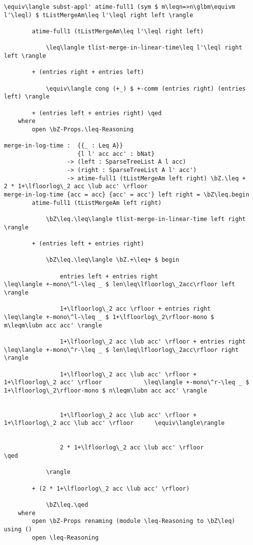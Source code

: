 \begin{lstlisting}[caption={Merging heaps},label={lst:appendix:heap:merge}]
            \equiv\langle subst-appl' atime-full1 (sym $ m\leqn=>n\glbm\equivm l'\leql) $ tListMergeAm\leq l'\leql right left \rangle

        atime-full1 (tListMergeAm\leq l'\leql right left)

            \leq\langle tlist-merge-in-linear-time\leq l'\leql right left \rangle

        + (entries right + entries left)

            \equiv\langle cong (+_) $ +-comm (entries right) (entries left) \rangle

        + (entries left + entries right) \qed
    where
        open \bZ-Props.\leq-Reasoning

merge-in-log-time :  {{_ : Leq A}}
                     {l l' acc acc' : bNat}
                  -> (left : SparseTreeList A l acc)
                  -> (right : SparseTreeList A l' acc')
                  -> atime-full1 (tListMergeAm left right) \bZ.\leq + 2 * 1+\lfloorlog\_2 acc \lub acc' \rfloor
merge-in-log-time {acc = acc} {acc' = acc'} left right = \bZ\leq.begin
        atime-full1 (tListMergeAm left right)

            \bZ\leq.\leq\langle tlist-merge-in-linear-time left right \rangle

        + (entries left + entries right)

            \bZ\leq.\leq\langle \bZ.+\leq+ $ begin

                entries left + entries right                     \leq\langle +-mono\^l-\leq _ $ len\leq\lfloorlog\_2acc\rfloor left \rangle

                1+\lfloorlog\_2 acc \rfloor + entries right                    \leq\langle +-mono\^l-\leq _ $ 1+\lfloorlog\_2\rfloor-mono $ m\leqm\lubn acc acc' \rangle

                1+\lfloorlog\_2 acc \lub acc' \rfloor + entries right             \leq\langle +-mono\^r-\leq _ $ len\leq\lfloorlog\_2acc\rfloor right \rangle

                1+\lfloorlog\_2 acc \lub acc' \rfloor + 1+\lfloorlog\_2 acc' \rfloor            \leq\langle +-mono\^r-\leq _ $ 1+\lfloorlog\_2\rfloor-mono $ n\leqm\lubn acc acc' \rangle


                1+\lfloorlog\_2 acc \lub acc' \rfloor + 1+\lfloorlog\_2 acc \lub acc' \rfloor      \equiv\langle\rangle


                2 * 1+\lfloorlog\_2 acc \lub acc' \rfloor                         \qed

            \rangle

        + (2 * 1+\lfloorlog\_2 acc \lub acc' \rfloor)

            \bZ\leq.\qed
    where
        open \bZ-Props renaming (module \leq-Reasoning to \bZ\leq) using ()
        open \leq-Reasoning
\end{lstlisting}
